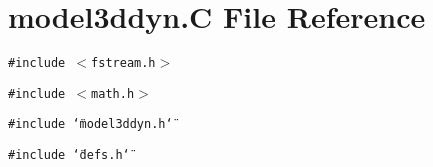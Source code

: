 \section{model3ddyn.C File Reference}
\label{model3ddyn_8C}
{\tt \#include $<$fstream.h$>$}\par
{\tt \#include $<$math.h$>$}\par
{\tt \#include \char`\"{}model3ddyn.h\char`\"{}}\par
{\tt \#include \char`\"{}defs.h\char`\"{}}\par
